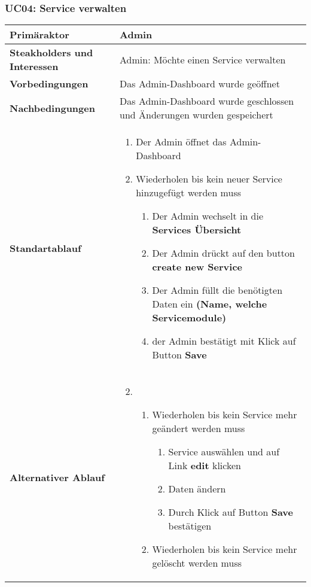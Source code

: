 \subsubsection{UC04: Service verwalten}

\begin{longtabu} to \textwidth {X[1,l] X[2,l]}
	\bfseries Primäraktor & Admin  \\\hline 
	\bfseries Steakholders und Interessen & Admin: Möchte einen Service verwalten  \\\hline 
	\bfseries Vorbedingungen & Das Admin-Dashboard wurde geöffnet
	\\\hline 
	\bfseries Nachbedingungen & Das Admin-Dashboard wurde geschlossen und Änderungen 
	wurden gespeichert  \\\hline 
	\bfseries Standartablauf & 
		\begin{enumerate}
			\item Der Admin öffnet das Admin-Dashboard
			\item Wiederholen bis kein neuer Service hinzugefügt werden muss
			\begin{enumerate}
			  \item Der Admin wechselt in die \textbf{Services Übersicht}
			  \item Der Admin drückt auf den button \textbf{create new Service}
			  \item Der Admin füllt die benötigten Daten ein \textbf{(Name, welche Servicemodule)}
			  \item der Admin bestätigt mit Klick auf Button \textbf{Save}
			\end{enumerate}
		\end{enumerate}
      \\\hline
      \bfseries Alternativer Ablauf & 
      \begin{enumerate}
        \setcounter{enumi}{1}
        \item 
        \begin{enumerate}
          \item Wiederholen bis kein Service mehr geändert werden muss
            \begin{enumerate}
              \item Service auswählen und auf Link \textbf{edit} klicken
              \item Daten ändern
              \item Durch Klick auf Button \textbf{Save} bestätigen
            \end{enumerate}
            \item Wiederholen bis kein Service mehr gelöscht werden muss

\end{enumerate}
\end{enumerate}
\end{longtabu}
